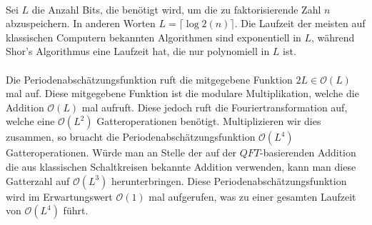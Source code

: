 \paragraph{}
Sei $L$ die Anzahl Bits, die benötigt wird, um die zu faktorisierende Zahl $n$ abzuspeichern. In anderen Worten $L = \lceil \log 2(n) \rceil$. Die Laufzeit der meisten auf klassischen Computern bekannten Algorithmen sind exponentiell in $L$, während Shor's Algorithmus eine Laufzeit hat, die nur polynomiell in $L$ ist. 
\paragraph{}
Die Periodenabschätzungsfunktion ruft die mitgegebene Funktion $2L \in \mathcal O(L)$ mal auf. Diese mitgegebene Funktion ist die modulare Multiplikation, welche die Addition $\mathcal O(L)$ mal aufruft. Diese jedoch ruft die Fouriertransformation auf, welche eine $\mathcal O(L^2)$ Gatteroperationen benötigt. Multiplizieren wir dies zusammen, so bruacht die Periodenabschätzungsfunktion $\mathcal O(L^4)$ Gatteroperationen. Würde man an Stelle der auf der $QFT$-basierenden Addition die aus klassischen Schaltkreisen bekannte Addition verwenden, kann man diese Gatterzahl auf $\mathcal O(L^3)$ herunterbringen. Diese Periodenabschätzungsfunktion wird im Erwartungswert $\mathcal O(1)$ mal aufgerufen, was zu einer gesamten Laufzeit von $\mathcal O(L^4)$ führt.